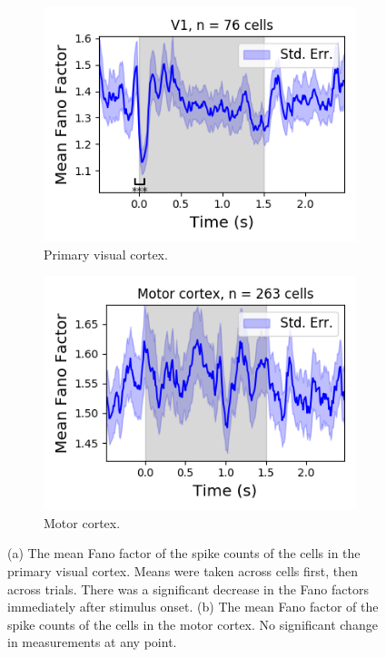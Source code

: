 \documentclass[a4paper,12pt]{article}
\theoremstyle{definition}
\begin{document}
  \begin{figure}[h]
    \begin{subfigure}[h]{0.5\linewidth}
      \includegraphics[width=\linewidth]{figures/v1_1ms_fano_factor.png}
      \caption{Primary visual cortex.}
      \label{fig:v1_1ms_fano_factor}
    \end{subfigure}
    \begin{subfigure}[h]{0.5\linewidth}
      \includegraphics[width=\linewidth]{figures/motor_cortex_1ms_fano_factor.png}
      \caption{Motor cortex.}
      \label{fig:motor_cortex_fano_factor}
    \end{subfigure}
    \caption{(a) The mean Fano factor of the spike counts of the cells in the primary visual cortex. Means were taken across cells first, then across trials. There was a significant decrease in the Fano factors immediately after stimulus onset. (b) The mean Fano factor of the spike counts of the cells in the motor cortex. No significant change in measurements at any point.}
    \label{fig:fano_factors}
  \end{figure}
\end{document}
